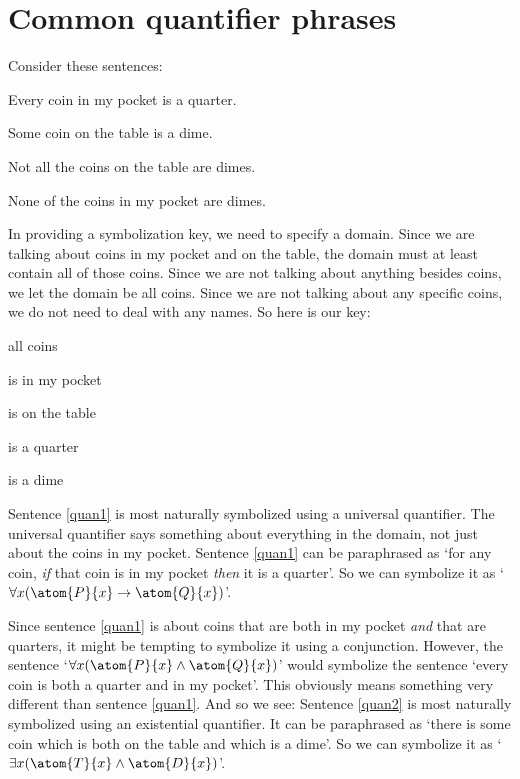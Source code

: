 

\section{Common quantifier phrases}
Consider these sentences:
	\begin{earg}
		\item[\ex{quan1}] Every coin in my pocket is a quarter.
		\item[\ex{quan2}] Some coin on the table is a dime.
		\item[\ex{quan3}] Not all the coins on the table are dimes.
		\item[\ex{quan4}] None of the coins in my pocket are dimes.
	\end{earg}
In providing a symbolization key, we need to specify a domain. Since we are talking about coins in my pocket and on the table, the domain must at least contain all of those coins. Since we are not talking about anything besides coins, we let the domain be all coins. Since we are not talking about any specific coins, we do not need to deal with any names. So here is our key:
	\begin{ekey}
		\item[\text{domain}] all coins
		\item[\atom{P}{x}]  is in my pocket
		\item[\atom{T}{x}]  is on the table
		\item[\atom{Q}{x}]  is a quarter
		\item[\atom{D}{x}]  is a dime
	\end{ekey}
Sentence \ref{quan1} is most naturally symbolized using a universal quantifier. The universal quantifier says something about everything in the domain, not just about the coins in my pocket. Sentence \ref{quan1} can be paraphrased as `for any coin, \emph{if} that coin is in my pocket \emph{then} it is a quarter'. So we can symbolize it as `$\forall x(\atom{P}{x} \eif \atom{Q}{x})$'.

Since sentence \ref{quan1} is about coins that are both in my pocket \emph{and} that are quarters, it might be tempting to symbolize it using a conjunction. However, the sentence `$\forall x(\atom{P}{x} \eand \atom{Q}{x})$' would symbolize the sentence `every coin is both a quarter and in my pocket'. This obviously means something very different than sentence \ref{quan1}. And so we see:
Sentence \ref{quan2} is most naturally symbolized using an existential quantifier. It can be paraphrased as `there is some coin which is both on the table and which is a dime'. So we can symbolize it as `$\exists x(\atom{T}{x} \eand \atom{D}{x})$'.

